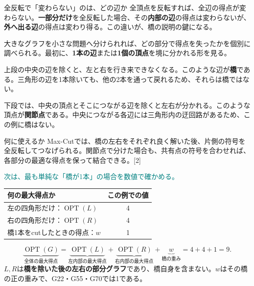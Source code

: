\begin{point}{全反転で「変わらない」のは、どの辺か}
全頂点を反転すれば、全辺の得点が変わらない。\textbf{一部分だけ}を全反転した場合、その\textbf{内部の辺}の得点は変わらないが、\textbf{外へ出る辺}の得点は変わり得る。この違いが、橋の説明の鍵になる。
\end{point}

\newpage
{}
大きなグラフを小さな問題へ分けられれば、どの部分で得点を失ったかを個別に調べられる。最初に、\textbf{1本の辺}または\textbf{1個の頂点}を境に分かれる形を見る。

上段の中央の辺を除くと、左と右を行き来できなくなる。このような辺が\textbf{橋}である。三角形の辺を1本除いても、他の2本を通って戻れるため、それらは橋ではない。

下段では、中央の頂点とそこにつながる辺を除くと左右が分かれる。このような頂点が\textbf{関節点}である。中央につながる各辺には三角形内の迂回路があるため、この例に橋はない。

\begin{point}{何に使えるか}
Max-Cutでは、橋の左右をそれぞれ良く解いた後、片側の符号を全反転してつなげられる。関節点で分けた場合も、共有点の符号を合わせれば、各部分の最適な得点を保って結合できる。[2]
\end{point}
\noindent\textcolor{teal}{次は、最も単純な「橋が1本」の場合を数値で確かめる。}

\newpage
{}

\begin{center}
\begin{tabular}{lc}\toprule
何の最大得点か & この例での値\\\midrule
左の四角形だけ：$\operatorname{OPT}(L)$ & 4\\
右の四角形だけ：$\operatorname{OPT}(R)$ & 4\\
橋1本をcutしたときの得点：$w$ & 1\\\bottomrule
\end{tabular}
\end{center}
\[
\underbrace{\operatorname{OPT}(G)}_{\text{全体の最大得点}}
=\underbrace{\operatorname{OPT}(L)}_{\text{左内部の最大得点}}
+\underbrace{\operatorname{OPT}(R)}_{\text{右内部の最大得点}}
+\underbrace{w}_{\text{橋の重み}}=4+4+1=9.
\]
$L,R$は\textbf{橋を除いた後の左右の部分グラフ}であり、橋自身を含まない。$w$はその橋の正の重みで、G22・G55・G70では1である。

